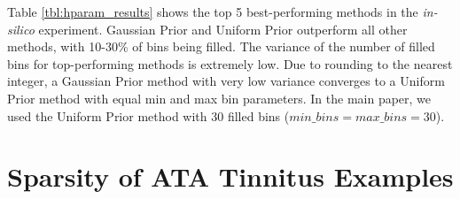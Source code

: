\documentclass[journal]{IEEEtran}
\begin{document}


Table \ref{tbl:hparam_results} shows the top 5 best-performing methods
in the \textit{in-silico} experiment.
Gaussian Prior and Uniform Prior outperform all other methods,
with 10-30\% of bins being filled.
The variance of the number of filled bins for top-performing methods
is extremely low.
Due to rounding to the nearest integer, a Gaussian Prior method with very low variance
converges to a Uniform Prior method with equal min and max bin parameters.
In the main paper, we used the Uniform Prior method with 30 filled bins ($min \_ bins = max \_ bins = 30$).

\section{Sparsity of ATA Tinnitus Examples}
\end{document}
